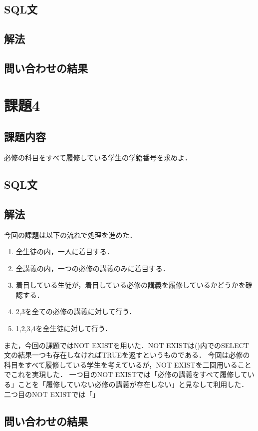 \documentclass[dvipdfmx]{jarticle}
\begin{document}
\subsection{SQL文}
\subsection{解法}
\subsection{問い合わせの結果}
\section{課題4}
\subsection{課題内容}
必修の科目をすべて履修している学生の学籍番号を求めよ．
\subsection{SQL文}
\subsection{解法}
今回の課題は以下の流れで処理を進めた．
\begin{enumerate}
    \item 全生徒の内，一人に着目する．
    \item 全講義の内，一つの必修の講義のみに着目する．
    \item 着目している生徒が，着目している必修の講義を履修しているかどうかを確認する．
    \item 2,3を全ての必修の講義に対して行う．
    \item 1,2,3,4を全生徒に対して行う．
\end{enumerate}
また，今回の課題ではNOT EXISTを用いた．NOT EXISTは()内でのSELECT文の結果一つも存在しなければTRUEを返すというものである．
今回は必修の科目をすべて履修している学生を考えているが，NOT EXISTを二回用いることでこれを実現した．
一つ目のNOT EXISTでは「必修の講義をすべて履修している」ことを「履修していない必修の講義が存在しない」と見なして利用した．
二つ目のNOT EXISTでは「」
\subsection{問い合わせの結果}
\end{document}
